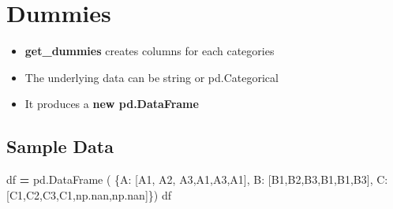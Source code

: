 \documentclass[
]{book}
\newenvironment{Shaded}{\begin{snugshade}}{\end{snugshade}}
\newcommand{\NormalTok}[1]{#1}
\newcommand{\OperatorTok}[1]{\textcolor[rgb]{0.43,0.43,0.43}{\textbf{#1}}}
\newcommand{\StringTok}[1]{\textcolor[rgb]{0.5,0.5,0.5}{#1}}
\providecommand{\tightlist}{%
  \setlength{\itemsep}{0pt}\setlength{\parskip}{0pt}}
\begin{document}
\hypertarget{dummies}{%
\section{Dummies}\label{dummies}}

\begin{itemize}
\tightlist
\item
  \textbf{get\_dummies} creates columns for each categories
\item
  The underlying data can be string or pd.Categorical\\
\item
  It produces a \textbf{new pd.DataFrame}
\end{itemize}

\hypertarget{sample-data-13}{%
\subsection{Sample Data}\label{sample-data-13}}

\begin{Shaded}
\begin{Highlighting}[]
\NormalTok{df }\OperatorTok{=}\NormalTok{ pd.DataFrame (}
\NormalTok{    \{}\StringTok{\textquotesingle{}A\textquotesingle{}}\NormalTok{: [}\StringTok{\textquotesingle{}A1\textquotesingle{}}\NormalTok{, }\StringTok{\textquotesingle{}A2\textquotesingle{}}\NormalTok{, }\StringTok{\textquotesingle{}A3\textquotesingle{}}\NormalTok{,}\StringTok{\textquotesingle{}A1\textquotesingle{}}\NormalTok{,}\StringTok{\textquotesingle{}A3\textquotesingle{}}\NormalTok{,}\StringTok{\textquotesingle{}A1\textquotesingle{}}\NormalTok{], }
     \StringTok{\textquotesingle{}B\textquotesingle{}}\NormalTok{: [}\StringTok{\textquotesingle{}B1\textquotesingle{}}\NormalTok{,}\StringTok{\textquotesingle{}B2\textquotesingle{}}\NormalTok{,}\StringTok{\textquotesingle{}B3\textquotesingle{}}\NormalTok{,}\StringTok{\textquotesingle{}B1\textquotesingle{}}\NormalTok{,}\StringTok{\textquotesingle{}B1\textquotesingle{}}\NormalTok{,}\StringTok{\textquotesingle{}B3\textquotesingle{}}\NormalTok{],}
     \StringTok{\textquotesingle{}C\textquotesingle{}}\NormalTok{: [}\StringTok{\textquotesingle{}C1\textquotesingle{}}\NormalTok{,}\StringTok{\textquotesingle{}C2\textquotesingle{}}\NormalTok{,}\StringTok{\textquotesingle{}C3\textquotesingle{}}\NormalTok{,}\StringTok{\textquotesingle{}C1\textquotesingle{}}\NormalTok{,np.nan,np.nan]\})}
\NormalTok{df}
\end{Highlighting}
\end{Shaded}
\end{document}
